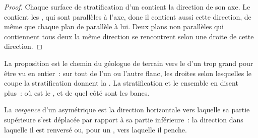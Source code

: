 \begin{proof}
Chaque surface de stratification d'un  contient la direction de son
axe. Le  contient les , qui sont parallèles à
l'axe, donc il contient aussi cette direction, de même que chaque plan de 
parallèle à lui. Deux plans non parallèles qui contiennent tous deux la même
direction se rencontrent selon une droite de cette direction.
\end{proof}

La proposition est le chemin du géologue de terrain vers le  d'un  trop grand
pour être vu en entier~: sur tout  de l'un ou l'autre flanc, les droites selon lesquelles le
 coupe la stratification donnent la . La stratification et le 
ensemble en disent plus~: où est le , et de quel côté sont les bancs.

\begin{definition}[Vergence]\label{def:b1:faults-folds-fabrics:vergence}
La \emph{vergence} d'un  asymétrique est la direction horizontale
vers laquelle sa partie supérieure s'est déplacée par rapport à sa partie inférieure~:
la direction dans laquelle il est renversé ou, pour un , vers laquelle
il penche.
\end{definition}

